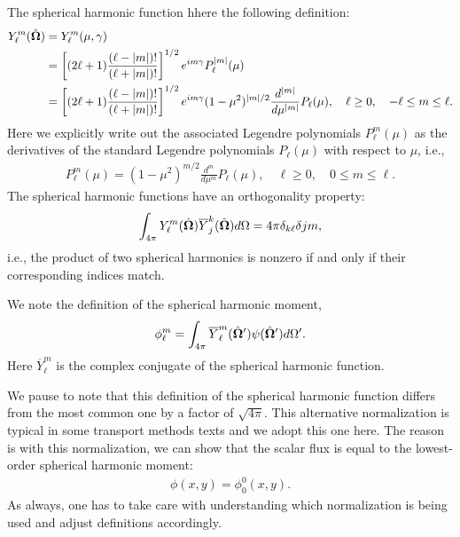 The spherical harmonic function hhere the following definition:
\begin{align}
  Y_\ell^m(\hat{\mathbf{\Omega}}) 
  &= Y_\ell^m(\mu,\gamma) \nonumber \\
  &= \left[ ( 2\ell + 1 ) \frac{ ( \ell - | m | ) ! }{ ( \ell + | m | )! } \right]^{1/2} e^{im\gamma} P_\ell^{|m|}(\mu) \nonumber \\
  &= \left[ ( 2\ell + 1 ) \frac{ ( \ell - | m | ) ! }{ ( \ell + | m | )! } \right]^{1/2} e^{im\gamma} ( 1 - \mu^2 )^{|m|/2} \frac{d^{|m|}}{d\mu^{|m|}} P_\ell(\mu) , \quad \ell \ge 0, \quad -\ell \le m \le \ell .
\end{align}
Here we explicitly write out the associated Legendre polynomials $P_\ell^m(\mu)$ as the derivatives of the standard Legendre polynomials $P_\ell(\mu)$ with respect to $\mu$, i.e.,
\begin{align}
  P_\ell^m(\mu) = ( 1 - \mu^2 )^{m/2} \frac{d^{m}}{d\mu^{m}} P_\ell(\mu), \quad \ell \ge 0, \quad 0 \le m \le \ell .
\end{align}
The spherical harmonic functions have an orthogonality property:
\begin{align}
  \int_{4\pi} Y_\ell^m(\hat{\mathbf{\Omega}}) \overline{Y}_j^k(\hat{\mathbf{\Omega}}) d\Omega = 4\pi \delta_{k \ell} \delta{j m} ,
\end{align}
i.e., the product of two spherical harmonics is nonzero if and only if their corresponding indices match.

We note the definition of the spherical harmonic moment,
\begin{align}
  \phi_\ell^m = \int_{4\pi}  \overline{Y}_\ell^m (\hat{\mathbf{\Omega}}') \psi(\hat{\mathbf{\Omega}}') d\Omega' .
\end{align}
Here $\overline{Y}_\ell^m$ is the complex conjugate of the spherical harmonic function.


We pause to note that this definition of the spherical harmonic function differs from the most common one by a factor of $\sqrt{4\pi}$. This alternative normalization is typical in some transport methods texts and we adopt this one here. The reason is with this normalization, we can show that the scalar flux is equal to the lowest-order spherical harmonic moment:
\begin{align}
  \phi(x,y) = \phi_0^0(x,y).
\end{align}
As always, one has to take care with understanding which normalization is being used and adjust definitions accordingly.

